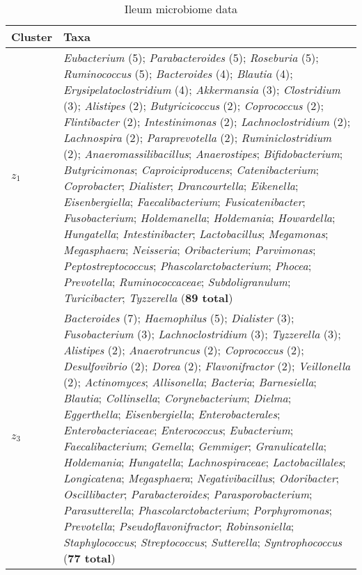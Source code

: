 \begin{table}[ht]
\centering
\caption{Ileum microbiome data}
\label{tab:ileum_taxa}
\begin{tabular}{p{1.2cm}p{12cm}}
\toprule
Cluster & Taxa \\
\midrule
$z_{1}$ & \textit{Eubacterium} (5); \textit{Parabacteroides} (5); \textit{Roseburia} (5); \textit{Ruminococcus} (5); \textit{Bacteroides} (4); \textit{Blautia} (4); \textit{Erysipelatoclostridium} (4); \textit{Akkermansia} (3); \textit{Clostridium} (3); \textit{Alistipes} (2); \textit{Butyricicoccus} (2); \textit{Coprococcus} (2); \textit{Flintibacter} (2); \textit{Intestinimonas} (2); \textit{Lachnoclostridium} (2); \textit{Lachnospira} (2); \textit{Paraprevotella} (2); \textit{Ruminiclostridium} (2); \textit{Anaeromassilibacillus}; \textit{Anaerostipes}; \textit{Bifidobacterium}; \textit{Butyricimonas}; \textit{Caproiciproducens}; \textit{Catenibacterium}; \textit{Coprobacter}; \textit{Dialister}; \textit{Drancourtella}; \textit{Eikenella}; \textit{Eisenbergiella}; \textit{Faecalibacterium}; \textit{Fusicatenibacter}; \textit{Fusobacterium}; \textit{Holdemanella}; \textit{Holdemania}; \textit{Howardella}; \textit{Hungatella}; \textit{Intestinibacter}; \textit{Lactobacillus}; \textit{Megamonas}; \textit{Megasphaera}; \textit{Neisseria}; \textit{Oribacterium}; \textit{Parvimonas}; \textit{Peptostreptococcus}; \textit{Phascolarctobacterium}; \textit{Phocea}; \textit{Prevotella}; \textit{Ruminococcaceae}; \textit{Subdoligranulum}; \textit{Turicibacter}; \textit{Tyzzerella} (\textbf{89 total}) \\
\addlinespace
$z_{3}$ & \textit{Bacteroides} (7); \textit{Haemophilus} (5); \textit{Dialister} (3); \textit{Fusobacterium} (3); \textit{Lachnoclostridium} (3); \textit{Tyzzerella} (3); \textit{Alistipes} (2); \textit{Anaerotruncus} (2); \textit{Coprococcus} (2); \textit{Desulfovibrio} (2); \textit{Dorea} (2); \textit{Flavonifractor} (2); \textit{Veillonella} (2); \textit{Actinomyces}; \textit{Allisonella}; \textit{Bacteria}; \textit{Barnesiella}; \textit{Blautia}; \textit{Collinsella}; \textit{Corynebacterium}; \textit{Dielma}; \textit{Eggerthella}; \textit{Eisenbergiella}; \textit{Enterobacterales}; \textit{Enterobacteriaceae}; \textit{Enterococcus}; \textit{Eubacterium}; \textit{Faecalibacterium}; \textit{Gemella}; \textit{Gemmiger}; \textit{Granulicatella}; \textit{Holdemania}; \textit{Hungatella}; \textit{Lachnospiraceae}; \textit{Lactobacillales}; \textit{Longicatena}; \textit{Megasphaera}; \textit{Negativibacillus}; \textit{Odoribacter}; \textit{Oscillibacter}; \textit{Parabacteroides}; \textit{Parasporobacterium}; \textit{Parasutterella}; \textit{Phascolarctobacterium}; \textit{Porphyromonas}; \textit{Prevotella}; \textit{Pseudoflavonifractor}; \textit{Robinsoniella}; \textit{Staphylococcus}; \textit{Streptococcus}; \textit{Sutterella}; \textit{Syntrophococcus} (\textbf{77 total}) \\
\bottomrule
\end{tabular}
\end{table}